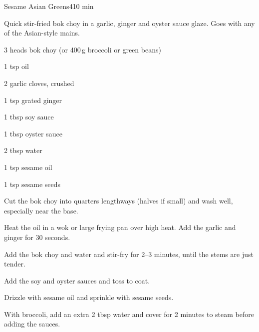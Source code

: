 \begin{recipebox}{Sesame Asian Greens}{4}{10 min}

Quick stir-fried bok choy in a garlic, ginger and oyster sauce glaze. Goes with
any of the Asian-style mains.

\begin{ingredients}
  \item 3 heads bok choy (or 400\,g broccoli or green beans)
  \item 1 tsp oil
  \item 2 garlic cloves, crushed
  \item 1 tsp grated ginger
  \item 1 tbsp soy sauce
  \item 1 tbsp oyster sauce
  \item 2 tbsp water
  \item 1 tsp sesame oil
  \item 1 tsp sesame seeds
\end{ingredients}

\begin{method}
  \item Cut the bok choy into quarters lengthways (halves if small) and wash well, especially near the base.
  \item Heat the oil in a wok or large frying pan over high heat. Add the garlic and ginger for 30 seconds.
  \item Add the bok choy and water and stir-fry for 2--3 minutes, until the stems are just tender.
  \item Add the soy and oyster sauces and toss to coat.
  \item Drizzle with sesame oil and sprinkle with sesame seeds.
\end{method}

\begin{notelist}
  \item With broccoli, add an extra 2 tbsp water and cover for 2 minutes to steam before adding the sauces.
\end{notelist}

\end{recipebox}
